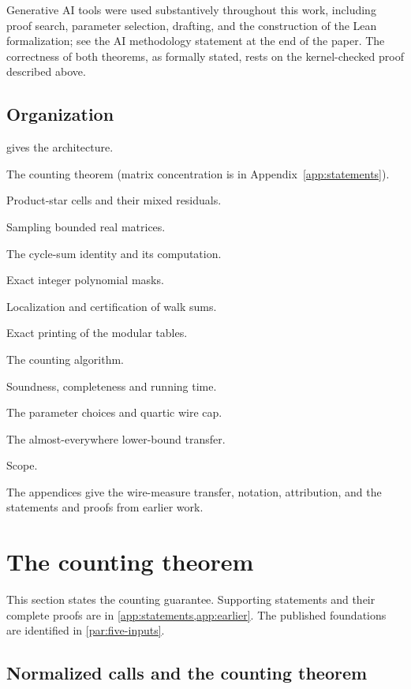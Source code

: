 \documentclass[11pt,letterpaper]{article}
\theoremstyle{definition}
\theoremstyle{remark}
\begin{document}
Generative AI tools were used substantively throughout this work, including proof search, parameter selection, drafting, and the construction of the Lean formalization; see the AI methodology statement at the end of the paper. The correctness of both theorems, as formally stated, rests on the kernel-checked proof described above.

\subsection{Organization}\label{sec:roadmap}

 gives the architecture.
\begin{description}[nosep,leftmargin=3.1em,labelwidth=2.6em,font=\normalfont]
\item[\S2] The counting theorem (matrix concentration is in Appendix~\ref{app:statements}).
\item[\S3] Product-star cells and their mixed residuals.
\item[\S4] Sampling bounded real matrices.
\item[\S5] The cycle-sum identity and its computation.
\item[\S6] Exact integer polynomial masks.
\item[\S7] Localization and certification of walk sums.
\item[\S8] Exact printing of the modular tables.
\item[\S9] The counting algorithm.
\item[\S10] Soundness, completeness and running time.
\item[\S11] The parameter choices and quartic wire cap.
\item[\S12] The almost-everywhere lower-bound transfer.
\item[\S13] Scope.
\end{description}
The appendices give the wire-measure transfer, notation, attribution,
and the statements and proofs from earlier work.

\section{The counting theorem}\label{sec:prelim}

This section states the counting guarantee. Supporting statements
and their complete proofs are in \cref{app:statements,app:earlier}.
The published foundations are identified
in \cref{par:five-inputs}.

\subsection{Normalized calls and the counting theorem}\label{sec:counting}
\end{document}
